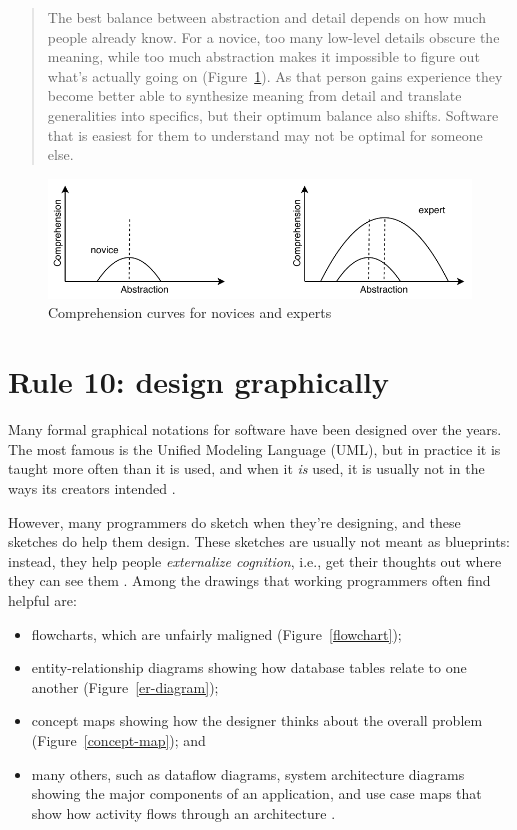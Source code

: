 \documentclass[10pt,letterpaper]{article}
\begin{document}
\begin{quotation}
  The best balance between abstraction and detail
  depends on how much people already know.
  For a novice,
  too many low-level details obscure the meaning,
  while too much abstraction makes it impossible to figure out what's actually going on
  (Figure~\ref{comprehension}).
  As that person gains experience
  they become better able to synthesize meaning from detail
  and translate generalities into specifics,
  but their optimum balance also shifts.
  Software that is easiest for them to understand may not be optimal for someone else.
\end{quotation}

\begin{figure}
  \centering
  \includegraphics{comprehension.pdf}
  \caption{Comprehension curves for novices and experts}
  \label{comprehension}
\end{figure}

\section*{Rule 10: design graphically}

Many formal graphical notations for software have been designed over the years.
The most famous is the Unified Modeling Language (UML),
but in practice it is taught more often than it is used,
and when it \emph{is} used,
it is usually not in the ways its creators intended \cite{Petre2013}.

However,
many programmers do sketch when they're designing,
and these sketches do help them design.
These sketches are usually not meant as blueprints:
instead,
they help people \emph{externalize cognition},
i.e.,
get their thoughts out where they can see them \cite{Cherubini2007,Petre2016}.
Among the drawings that working programmers often find helpful are:

\begin{itemize}
\item
  flowcharts, which are unfairly maligned \cite{Scanlan1989}
  (Figure~\ref{flowchart});
\item
  entity-relationship diagrams showing how database tables relate to one another
  (Figure~\ref{er-diagram});
\item
  concept maps showing how the designer thinks about the overall problem
  (Figure~\ref{concept-map}); and
\item
  many others,
  such as dataflow diagrams,
  system architecture diagrams showing the major components of an application,
  and use case maps that show how activity flows through an architecture \cite{Reekie2006}.
\end{itemize}
\end{document}
